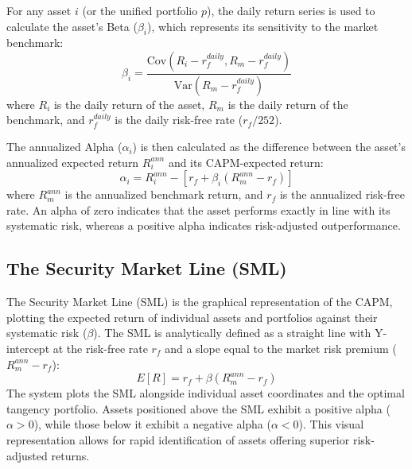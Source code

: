 \documentclass[11pt,a4paper]{article}
\begin{document}
For any asset $i$ (or the unified portfolio $p$), the daily return series is used to calculate the asset's Beta ($\beta_i$), which represents its sensitivity to the market benchmark:
\begin{equation}
\beta_i = \frac{\text{Cov}(R_i - r_f^{daily}, R_m - r_f^{daily})}{\text{Var}(R_m - r_f^{daily})}
\end{equation}
where $R_i$ is the daily return of the asset, $R_m$ is the daily return of the benchmark, and $r_f^{daily}$ is the daily risk-free rate ($r_f / 252$).

The annualized Alpha ($\alpha_i$) is then calculated as the difference between the asset's annualized expected return $R_i^{ann}$ and its CAPM-expected return:
\begin{equation}
\alpha_i = R_i^{ann} - \left[ r_f + \beta_i \left( R_m^{ann} - r_f \right) \right]
\end{equation}
where $R_m^{ann}$ is the annualized benchmark return, and $r_f$ is the annualized risk-free rate. An alpha of zero indicates that the asset performs exactly in line with its systematic risk, whereas a positive alpha indicates risk-adjusted outperformance.

\subsection{The Security Market Line (SML)}
The Security Market Line (SML) is the graphical representation of the CAPM, plotting the expected return of individual assets and portfolios against their systematic risk ($\beta$). The SML is analytically defined as a straight line with Y-intercept at the risk-free rate $r_f$ and a slope equal to the market risk premium ($R_m^{ann} - r_f$):
\begin{equation}
E[R] = r_f + \beta \left( R_m^{ann} - r_f \right)
\end{equation}
The system plots the SML alongside individual asset coordinates and the optimal tangency portfolio. Assets positioned above the SML exhibit a positive alpha ($\alpha > 0$), while those below it exhibit a negative alpha ($\alpha < 0$). This visual representation allows for rapid identification of assets offering superior risk-adjusted returns.
\end{document}
